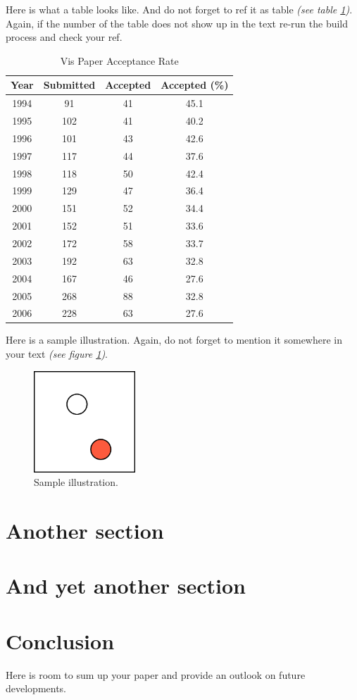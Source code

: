 \documentclass[journal]{vgtc}                %
\begin{document}
Here is what a table looks like. And do not forget to ref it as table \textit{(see table \ref{tab:vis_accept})}.
Again, if the number of the table does not show up in the text re-run the build process and check your ref.


\begin{table}
  \caption{Vis Paper Acceptance Rate}
  \label{tab:vis_accept}
  \scriptsize
  \begin{center}
    \begin{tabular}{cccc}
      Year & Submitted & Accepted & Accepted (\%)\\
    \hline
      1994 &  91 & 41 & 45.1\\
      1995 & 102 & 41 & 40.2\\
      1996 & 101 & 43 & 42.6\\
      1997 & 117 & 44 & 37.6\\
      1998 & 118 & 50 & 42.4\\
      1999 & 129 & 47 & 36.4\\
      2000 & 151 & 52 & 34.4\\
      2001 & 152 & 51 & 33.6\\
      2002 & 172 & 58 & 33.7\\
      2003 & 192 & 63 & 32.8\\
      2004 & 167 & 46 & 27.6\\
      2005 & 268 & 88 & 32.8\\
      2006 & 228 & 63 & 27.6
    \end{tabular}
  \end{center}
\end{table}

Here is a sample illustration. Again, do not forget to mention it somewhere in your text \textit{(see figure \ref{fig:sampleimage})}.
\begin{figure}[htb]
  \centering
  \includegraphics[width=1.5in]{sample}
  \caption{Sample illustration.}
  \label{fig:sampleimage}
\end{figure}

 
\section{Another section}

\section{And yet another section}


\section{Conclusion}

Here is room to sum up your paper and provide an outlook on future developments.
\nocite{*}
%
\printbibliography
\end{document}
